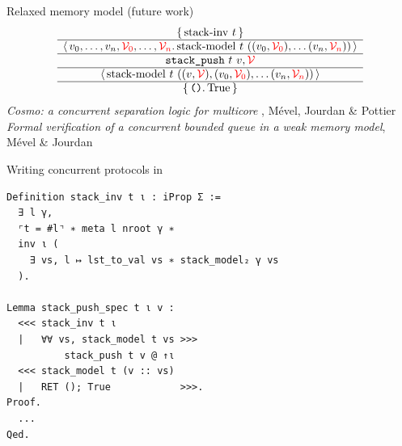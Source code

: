 \begin{frame}{Relaxed memory model (future work)}
\centering
\large
\[
    \begin{array}{c} \left\lbrace\, 
      \mathrm{stack {\hbox{-}} inv}\ t
     \,\right\rbrace \\ \hline \left\langle\, 
      v_0, \dots, v_n, \textcolor{red}{\mathcal{V}_0}, \dots, \textcolor{red}{\mathcal{V}_n}
     \ldotp 
      \mathrm{stack {\hbox{-}} model}\ t\ ((v_0, \textcolor{red}{\mathcal{V}_0}), \dots (v_n, \textcolor{red}{\mathcal{V}_n}))
     \,\right\rangle \\ \hline 
      \texttt{stack\_push}\ t\ v, \textcolor{red}{\mathcal{V}}
     \\ \hline \left\langle\, 
      \mathrm{stack {\hbox{-}} model}\ t\ ((v, \textcolor{red}{\mathcal{V}}), (v_0, \textcolor{red}{\mathcal{V}_0}), \dots (v_n, \textcolor{red}{\mathcal{V}_n}))
     \,\right\rangle \\ \hline \left\lbrace\, 
      \texttt{()}
     \ldotp 
      \mathrm{True}
     \,\right\rbrace \end{array}
\]
\vfill
\normalsize
\emph{Cosmo: a concurrent separation logic for multicore \OCaml}, Mével, Jourdan \& Pottier \\
\medskip
\emph{Formal verification of a concurrent bounded queue in a weak memory model}, Mével \& Jourdan
\end{frame}

\begin{frame}[fragile]{Writing concurrent protocols in \Iris}
\small
\begin{verbatim}
Definition stack_inv t ι : iProp Σ :=
  ∃ l γ,
  ⌜t = #l⌝ ∗ meta l nroot γ ∗
  inv ι (
    ∃ vs, l ↦ lst_to_val vs ∗ stack_model₂ γ vs
  ).

Lemma stack_push_spec t ι v :
  <<< stack_inv t ι
  |   ∀∀ vs, stack_model t vs >>>
          stack_push t v @ ↑ι
  <<< stack_model t (v :: vs)
  |   RET (); True            >>>.
Proof.
  ...
Qed.
\end{verbatim}
\end{frame}